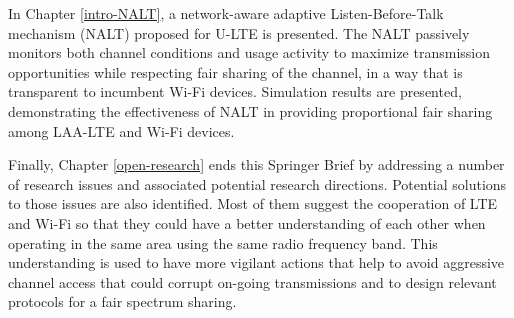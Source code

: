 In Chapter \ref{intro-NALT}, a network-aware adaptive Listen-Before-Talk mechanism (NALT) proposed for U-LTE is presented. The NALT passively monitors both channel conditions and usage activity to maximize transmission opportunities while respecting fair sharing of the channel, in a way that is transparent to incumbent Wi-Fi devices. Simulation results are presented, demonstrating the effectiveness of NALT in providing proportional fair sharing among LAA-LTE and Wi-Fi devices.

Finally, Chapter \ref{open-research} ends this Springer Brief by addressing a number of research issues and associated potential research directions. Potential solutions to those issues are also identified. Most of them suggest the cooperation of LTE and Wi-Fi so that they could have a better understanding of each other when operating in the same area using the same radio frequency band. This understanding is used to have more vigilant actions that help to avoid aggressive channel access that could corrupt on-going transmissions and to design relevant protocols for a fair spectrum sharing.


